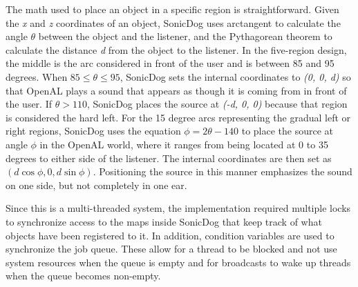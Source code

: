 The math used to place an object in a specific region is straightforward. Given
the \emph{x} and \emph{z} coordinates of an object, SonicDog uses arctangent to 
calculate the angle \begin{math}\theta\end{math} between the object and the 
listener, and the Pythagorean theorem to calculate the distance \emph{d} from the
object to the listener. In the five-region design, the middle is the arc 
considered in front of the user and is between 85 and 95 degrees. When 
\begin{math}85\leq\theta\leq95\end{math}, SonicDog sets the internal coordinates
to \emph{(0, 0, d)} so that OpenAL plays a sound that appears as though it is 
coming from in front of the user. If \begin{math}\theta>110\end{math}, SonicDog
places the source at \emph{(-d, 0, 0)} because that region is considered the 
hard left. For the 15 degree arcs representing the gradual left or right 
regions, SonicDog uses the equation \begin{math}\phi=2\theta-140\end{math} to 
place the source at angle \begin{math}\phi\end{math} in the OpenAL world, where 
it ranges from being located at 0 to 35 degrees to either side of the listener. 
The internal coordinates are then set as 
\begin{math}(d\cos\phi, 0, d\sin\phi)\end{math}. Positioning the source in this
manner emphasizes the sound on one side, but not
completely in one ear.

Since this is a multi-threaded system, the implementation required multiple
locks to synchronize access to the maps inside SonicDog that keep track of what
objects have been registered to it. In addition, condition variables are used to
synchronize the job queue. These allow for a thread to be blocked and not use 
system resources when the queue is empty and for broadcasts to wake up threads 
when the queue becomes non-empty.

